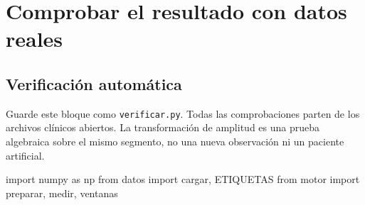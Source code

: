 \documentclass[
  spanish,
  10.5pt,
  a4paper,
  DIV=11,
  numbers=noendperiod]{scrartcl}
\newenvironment{Shaded}{\begin{snugshade}}{\end{snugshade}}
\newcommand{\ImportTok}[1]{\textcolor[rgb]{0.00,0.46,0.62}{#1}}
\newcommand{\NormalTok}[1]{\textcolor[rgb]{0.00,0.23,0.31}{#1}}
\begin{document}
\section{Comprobar el resultado con datos
reales}\label{comprobar-el-resultado-con-datos-reales}

\subsection{Verificación
automática}\label{verificaciuxf3n-automuxe1tica}

Guarde este bloque como \texttt{verificar.py}. Todas las comprobaciones
parten de los archivos clínicos abiertos. La transformación de amplitud
es una prueba algebraica sobre el mismo segmento, no una nueva
observación ni un paciente artificial.

\begin{Shaded}
\begin{Highlighting}[]
\ImportTok{import}\NormalTok{ numpy }\ImportTok{as}\NormalTok{ np}
\ImportTok{from}\NormalTok{ datos }\ImportTok{import}\NormalTok{ cargar, ETIQUETAS}
\ImportTok{from}\NormalTok{ motor }\ImportTok{import}\NormalTok{ preparar, medir, ventanas}


\end{Highlighting}
\end{Shaded}
\end{document}
